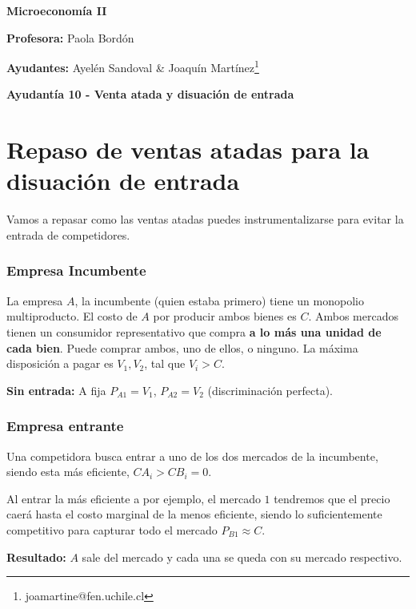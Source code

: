 \documentclass{exam}
\renewcommand{\thefootnote}{\fnsymbol{footnote}}
\begin{document}
\begin{center}

\LARGE{\textbf{Microeconomía II}}

\medskip
\normalsize \textbf{Profesora:} Paola Bordón

\normalsize \textbf{Ayudantes:} Ayelén Sandoval \& Joaquín Martínez\footnote[2]{joamartine@fen.uchile.cl}


\medskip
\large{\textbf{Ayudantía 10 - Venta atada y disuación de entrada}}

\end{center}

\tableofcontents

\renewcommand{\thefootnote}{\Roman{footnote}}

\section{Repaso de ventas atadas para la disuación de entrada}

Vamos a repasar como las ventas atadas puedes instrumentalizarse para evitar la entrada de competidores.

\subsubsection*{Empresa Incumbente}
La empresa $A$, la incumbente (quien estaba primero) tiene un monopolio multiproducto. El costo de $A$ por producir ambos bienes es $C$. Ambos mercados tienen un consumidor representativo que compra \textbf{a lo más una unidad de cada bien}. Puede comprar ambos, uno de ellos, o ninguno. La máxima disposición a pagar es $V_1, V_2$, tal que $V_i > C$.

\textbf{Sin entrada:} A fija $P_{A1} = V_1$, $P_{A2} = V_2$ (discriminación perfecta). 

\subsubsection*{Empresa entrante}
Una competidora busca entrar a uno de los dos mercados de la incumbente, siendo esta más eficiente, $CA_i > CB_i = 0$. 

Al entrar la más eficiente a por ejemplo, el mercado $1$ tendremos que el precio caerá hasta el costo marginal de la menos eficiente, siendo lo suficientemente competitivo para capturar todo el mercado $P_{B1} \approx C$. 

\textbf{Resultado:} $A$ sale del mercado y cada una se queda con su mercado respectivo. 
\end{document}
